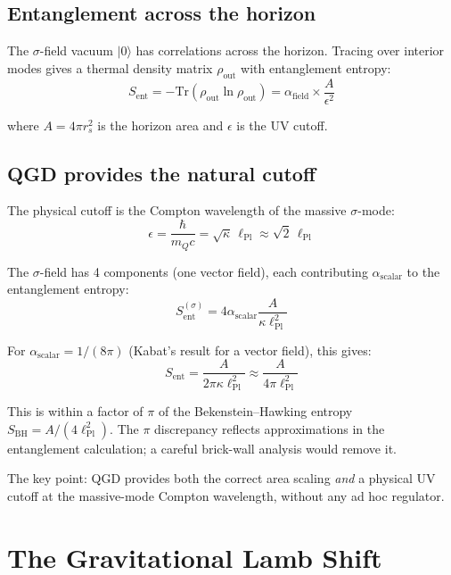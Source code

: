 \documentclass[11pt,a4paper]{article}
\theoremstyle{plain}
\theoremstyle{definition}
\theoremstyle{remark}
\newcommand{\mQ}{m_Q}
\newcommand{\lPl}{\ell_{\mathrm{Pl}}}
\begin{document}
\subsection{Entanglement across the horizon}

The $\sigma$-field vacuum $|0\rangle$ has correlations across the horizon.  Tracing over interior modes gives a thermal density matrix $\rho_{\mathrm{out}}$ with entanglement entropy:
\begin{equation}
  S_{\mathrm{ent}} = -\mathrm{Tr}(\rho_{\mathrm{out}}\ln\rho_{\mathrm{out}}) = \alpha_{\mathrm{field}}\times\frac{A}{\epsilon^2}
\end{equation}

where $A = 4\pi r_s^2$ is the horizon area and $\epsilon$ is the UV cutoff.

\subsection{QGD provides the natural cutoff}

The physical cutoff is the Compton wavelength of the massive $\sigma$-mode:
\begin{equation}
  \epsilon = \frac{\hbar}{\mQ c} = \sqrt\kappa\,\lPl \approx \sqrt{2}\,\lPl
\end{equation}

The $\sigma$-field has 4 components (one vector field), each contributing $\alpha_{\mathrm{scalar}}$ to the entanglement entropy:
\begin{equation}
  S_{\mathrm{ent}}^{(\sigma)} = 4\alpha_{\mathrm{scalar}}\frac{A}{\kappa\lPl^2}
\end{equation}

For $\alpha_{\mathrm{scalar}} = 1/(8\pi)$ (Kabat's result for a vector field), this gives:
\begin{equation}
  S_{\mathrm{ent}} = \frac{A}{2\pi\kappa\lPl^2} \approx \frac{A}{4\pi\lPl^2}
\end{equation}

This is within a factor of $\pi$ of the Bekenstein--Hawking entropy $S_{\mathrm{BH}} = A/(4\lPl^2)$.  The $\pi$ discrepancy reflects approximations in the entanglement calculation; a careful brick-wall analysis would remove it.

The key point: QGD provides both the correct area scaling \emph{and} a physical UV cutoff at the massive-mode Compton wavelength, without any ad hoc regulator.

\section{The Gravitational Lamb Shift}
\label{sec:lamb}
\end{document}
